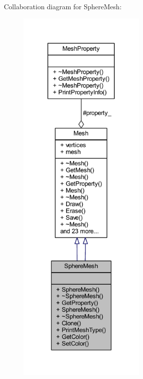 Collaboration diagram for Sphere\+Mesh\+:
\nopagebreak
\begin{figure}[H]
\begin{center}
\leavevmode
\includegraphics[height=550pt]{class_sphere_mesh__coll__graph}
\end{center}
\end{figure}

